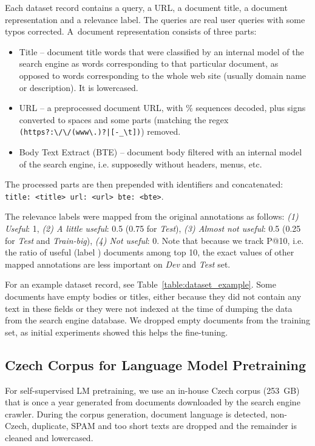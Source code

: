 \documentclass[letterpaper]{article} \usepackage{aaai22 }  \usepackage{times}  \usepackage{helvet}  \usepackage{courier}  \usepackage[hyphens]{url}  \usepackage{graphicx} \usepackage{amsmath,amsfonts,amssymb, mathabx,bm,bbm}
\begin{document}
Each dataset record contains a query, a URL, a document title, a document representation and a relevance label.
The queries are real user queries with some typos corrected. A~document representation consists of three parts:
\begin{itemize}
    \item Title -- document title words that were classified by an internal model of the search engine as words corresponding to that particular document, as opposed to words corresponding to the whole web site (usually domain name or description). It is lowercased.
    \item URL -- a preprocessed document URL, with \% sequences decoded, plus signs converted to spaces and some parts (matching the regex \verb#(https?:\/\/(www\.)?|[-_\t])#) removed.
    \item Body Text Extract (BTE) -- document body filtered with an internal model of the search engine, i.e. supposedly without headers, menus, etc.
\end{itemize}
The processed parts are then prepended with identifiers and concatenated: \texttt{title: <title> url: <url> bte: <bte>}. 

The relevance labels were mapped from the original annotations as follows: \textit{(1) Useful}: 1,
\textit{(2) A little useful}: 0.5 (0.75 for \textit{Test}),
\textit{(3) Almost not useful}: 0.5 (0.25 for \textit{Test} and \textit{Train-big}),
\textit{(4) Not useful}: 0.
Note that because we track P@10, i.e. the ratio of useful (label ) documents among top 10, the exact values of other mapped annotations are less important on \textit{Dev} and \textit{Test} set.

For an example dataset record, see Table~\ref{table:dataset_example}. Some documents have empty bodies or titles, either because they did not contain any text in these fields or they were not indexed at the time of dumping the data from the search engine database. We dropped empty documents from the training set, as initial experiments showed  this helps the fine-tuning.

\subsection{Czech Corpus for Language Model Pretraining}
\label{ssec:czech_corpus_pretraining}
For self-supervised LM pretraining, we use an in-house Czech corpus (253~GB) that is once a year generated from documents downloaded by the search engine crawler. During the corpus generation, document language is detected, non-Czech, duplicate, SPAM and too short texts are dropped and the remainder is cleaned and lowercased.
\end{document}

